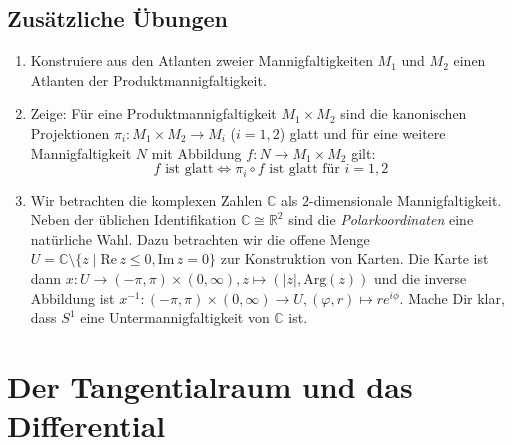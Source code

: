 \documentclass[a4paper,headsepline,headheight=30pt,numbers=enddot]{scrartcl}
\newcommand{\R}{\mathbb{R}}
\begin{document}
	\subsection*{Zusätzliche Übungen}
	\begin{enumerate}
		\item Konstruiere aus den Atlanten zweier Mannigfaltigkeiten $M_1$ und $M_2$ einen Atlanten der Produktmannigfaltigkeit.
		\item Zeige: Für eine Produktmannigfaltigkeit $M_1\times M_2$ sind die kanonischen Projektionen $\pi_i\colon M_1\times M_2\rightarrow M_i$ ($i=1,2$) glatt und für eine weitere Mannigfaltigkeit $N$ mit Abbildung $f\colon N\rightarrow M_1\times M_2$ gilt:
		\begin{equation}
		\text{$f$ ist glatt} \Leftrightarrow \pi_i\circ f \text{ ist glatt für } i=1,2
		\end{equation}
		\item Wir betrachten die komplexen Zahlen $\mathbb{C}$ als $2$-dimensionale Mannigfaltigkeit. Neben der üblichen Identifikation $\mathbb{C}\cong\R^2$ sind die \emph{Polarkoordinaten} eine natürliche Wahl. Dazu betrachten wir die offene Menge $U = \mathbb{C}\setminus\{z\mid \mathrm{Re}\,z\leq 0, \mathrm{Im}\,z=0\}$ zur Konstruktion von Karten.  Die Karte ist dann $x\colon U\rightarrow (-\pi,\pi)\times (0,\infty), z\mapsto (\lvert z\rvert, \mathrm{Arg}(z))$ und die inverse Abbildung ist $x^{-1}\colon (-\pi,\pi)\times (0,\infty)\rightarrow U, (\varphi,r)\mapsto re^{i\phi}$. Mache Dir klar, dass $S^1$ eine Untermannigfaltigkeit von $\mathbb{C}$ ist.
	\end{enumerate}

	\newpage
	\section[Der Tangentialraum]{Der Tangentialraum und das Differential}
\end{document}
